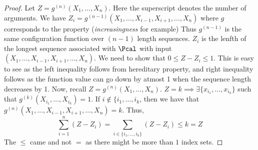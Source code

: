 \begin{proof}
Let $Z = g^{(n)}(X_1, \dots, X_n)$. Here the superscript denotes the number of arguments. We have $Z_i = g^{(n-1)}(X_1, \dots, X_{i-1}, X_{i+1}, \dots, X_n)$ where $g$ corresponds to the property (\textit{increasingness} for example) Thus $g^{(n-1)}$ is the same configuration function over $(n-1)$ length sequences. $Z_i$ is the lenfth of the longest sequence associated with $\Pcal$ with input $(X_1, \dots, X_{i-1}, X_{i+1}, \dots, X_n)$. We need to show that $0 \leq Z - Z_i \leq 1$. This is easy to see as the left inequality follows from hereditary property, and right inequality follows as the function value can go down by atmost 1 when the sequence length decreases by 1. Now, recall $Z = g^{(n)}(X_1, \dots, X_n)$. $Z = k \implies \exists \{x_{i_1}, \dots, x_{i_k}\}$ such that $g^{(k)}(X_{i_1}, \dots, X_{i_k}) = 1$. If $ i \notin \{i_1, \dots, i_k$, then we have that $g^{(n)}(X_1, \dots, X_{i-1}, X_{i+1}, \dots, X_n) = k$. Thus,
\[
\sum_{i=1}^n (Z - Z_i) = \sum_{i \in \{i_1, \dots, i_k\}} (Z - Z_i) \leq k = Z
\]
The $\leq$ came and not $=$ as there might be more than $1$ index sets.
\end{proof}